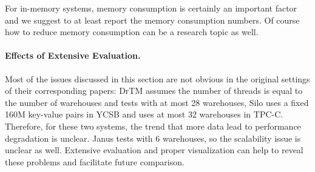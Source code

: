 For in-memory systems, memory consumption is certainly an important factor and
we suggest to at least report the memory consumption numbers. Of course how
to reduce memory consumption can be a research topic as well.


\vspace{-.1in}
\paragraph{Effects of Extensive Evaluation.}
Most of the issues discussed in this section are not obvious in the original
settings of their corresponding papers: DrTM assumes the number of threads
is equal to the number of warehouses and tests with at most 28 warehouses,
Silo uses a fixed 160M key-value pairs in YCSB and uses at most 32 warehouses
in TPC-C. Therefore, for these two systems, the trend that
more data lead to performance degradation is unclear. Janus tests with 6 warehouses,
so the scalability issue is unclear as well.
Extensive evaluation and proper visualization can help to reveal these problems
and facilitate future comparison.


